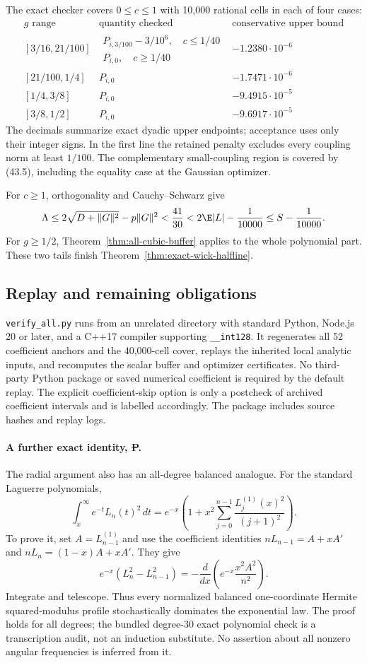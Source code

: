 The exact checker covers $0\le c\le1$ with 10,000 rational cells in
each of four cases:
\[
\begin{array}{c|l|c}
g\text{ range}&\text{quantity checked}&
\text{conservative upper bound}\\ \hline
{[3/16,21/100]}&
 \begin{array}{l}
 P_{i,3/100}-3/10^6,\quad c\le1/40\\
 P_{i,0},\quad c\ge1/40
 \end{array}&-1.2380\cdot10^{-6}\\
{[21/100,1/4]}&P_{i,0}&-1.7471\cdot10^{-6}\\
{[1/4,3/8]}&P_{i,0}&-9.4915\cdot10^{-5}\\
{[3/8,1/2]}&P_{i,0}&-9.6917\cdot10^{-5}
\end{array}
\]
The decimals summarize exact dyadic upper endpoints; acceptance uses
only their integer signs. In the first line the retained penalty
excludes every coupling norm at least $1/100$. The complementary
small-coupling region is covered by (43.5), including the equality
case at the Gaussian optimizer.

For $c\ge1$, orthogonality and Cauchy--Schwarz give
\[
 \Lambda\le2\sqrt{D+\|G\|^2}-p\|G\|^2
 <\frac{41}{30}<2\E|L|-\frac1{10000}\le S-\frac1{10000}.
\]
For $g\ge1/2$, Theorem~\ref{thm:all-cubic-buffer} applies to the whole
polynomial part. These two tails finish
Theorem~\ref{thm:exact-wick-halfline}.

\subsection{Replay and remaining obligations}
\texttt{verify\_all.py} runs from an unrelated directory with standard
Python, Node.js 20 or later, and a C++17 compiler supporting
\texttt{\_\_int128}. It regenerates all 52 coefficient anchors and the
40,000-cell cover, replays the inherited local analytic inputs, and
recomputes the scalar buffer and optimizer certificates. No third-party
Python package or saved numerical coefficient is required by the
default replay. The explicit coefficient-skip option is only a
postcheck of archived coefficient intervals and is labelled accordingly.
The package includes source hashes and replay logs.

\paragraph{A further exact identity, \st{P}.}
The radial argument also has an all-degree balanced analogue. For the
standard Laguerre polynomials,
\[
 \int_x^\infty e^{-t}L_n(t)^2\,dt
 =e^{-x}\left(1+x^2\sum_{j=0}^{n-1}
                  \frac{L_j^{(1)}(x)^2}{(j+1)^2}\right).
\]
To prove it, set $A=L_{n-1}^{(1)}$ and use the coefficient identities
$nL_{n-1}=A+xA'$ and $nL_n=(1-x)A+xA'$. They give
\[
 e^{-x}(L_n^2-L_{n-1}^2)
 =-\frac{d}{dx}\left(e^{-x}\frac{x^2A^2}{n^2}\right).
\]
Integrate and telescope. Thus every normalized balanced one-coordinate
Hermite squared-modulus profile stochastically dominates the exponential
law. The proof holds for all degrees; the bundled degree-30 exact
polynomial check is a transcription audit, not an induction substitute.
No assertion about all nonzero angular frequencies is inferred from it.

